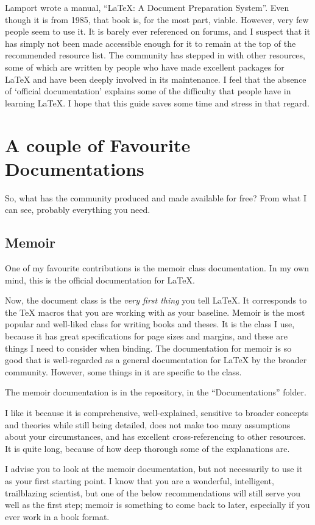 \documentclass[11pt, oneside]{memoir}
\begin{document}
Lamport wrote a manual, ``LaTeX: A Document Preparation System''. Even though it is from 1985, that book is, for the most part, viable. However, very few people seem to use it. It is barely ever referenced on forums, and I suspect that it has simply not been made accessible enough for it to remain at the top of the recommended resource list. The community has stepped in with other resources, some of which are written by people who have made excellent packages for LaTeX and have been deeply involved in its maintenance. I feel that the absence of `official documentation' explains some of the difficulty that people have in learning LaTeX. I hope that this guide saves some time and stress in that regard.

\section{A couple of Favourite Documentations}
So, what has the community produced and made available for free? From what I can see, probably everything you need.

\subsection{Memoir}

One of my favourite contributions is the memoir class documentation. In my own mind, this is the official documentation for LaTeX.

Now, the document class is the \emph{very first thing} you tell LaTeX. It corresponds to the TeX macros that you are working with as your baseline. Memoir is the most popular and well-liked class for writing books and theses. It is the class I use, because it has great specifications for page sizes and margins, and these are things I need to consider when binding. The documentation for memoir is so good that is well-regarded as a general documentation for LaTeX by the broader community. However, some things in it are specific to the class.

The memoir documentation is in the repository, in the  ``Documentations'' folder. 

I like it because it is comprehensive, well-explained, sensitive to broader concepts and theories while still being detailed, does not make too many assumptions about your circumstances, and has excellent cross-referencing to other resources. It is quite long, because of how deep thorough some of the explanations are.

I advise you to look at the memoir documentation, but not necessarily to use it as your first starting point. I know that you are a wonderful, intelligent, trailblazing scientist, but one of the below recommendations will still serve you well as the first step; memoir is something to come back to later, especially if you ever work in a book format.
\end{document}
